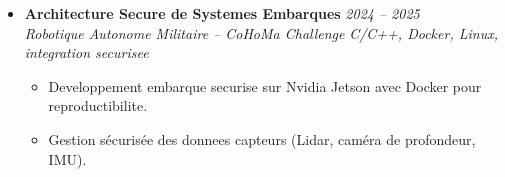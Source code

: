 \documentclass[a4paper,11pt]{article}
\begin{document}
\begin{itemize}[leftmargin=*, label={-}]
\item \textbf{Architecture Secure de Systemes Embarques} \hfill \textit{2024 -- 2025} \\
\textit{Robotique Autonome Militaire -- CoHoMa Challenge} \hfill \textit{C/C++, Docker, Linux, integration securisee}
\vspace{-2pt}
    \begin{itemize}[leftmargin=0.4cm, nosep, label=\tiny$\bullet$]
        \item \small{Developpement embarque securise sur Nvidia Jetson avec Docker pour reproductibilite.}
        \item \small{Gestion sécurisée des donnees capteurs (Lidar, caméra de profondeur, IMU).}
    \end{itemize}

\end{itemize}
\end{document}
